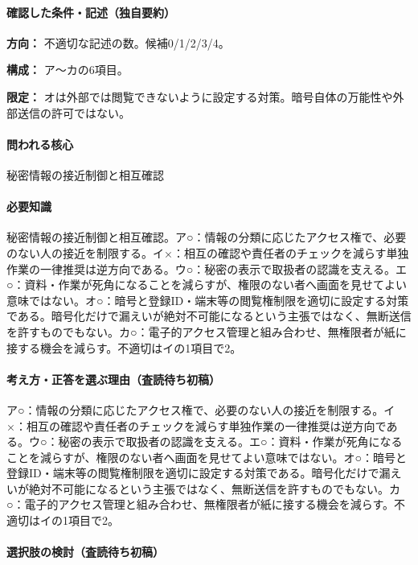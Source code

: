 \paragraph{確認した条件・記述（独自要約）}\mbox{}\par

\noindent\textbf{方向：} 不適切な記述の数。候補0/1/2/3/4。\par

\noindent\textbf{構成：} ア〜カの6項目。\par

\noindent\textbf{限定：} オは外部では閲覧できないように設定する対策。暗号自体の万能性や外部送信の許可ではない。\par

\paragraph{問われる核心} 秘密情報の接近制御と相互確認

\paragraph{必要知識} 秘密情報の接近制御と相互確認。ア○：情報の分類に応じたアクセス権で、必要のない人の接近を制限する。イ×：相互の確認や責任者のチェックを減らす単独作業の一律推奨は逆方向である。ウ○：秘密の表示で取扱者の認識を支える。エ○：資料・作業が死角になることを減らすが、権限のない者へ画面を見せてよい意味ではない。オ○：暗号と登録ID・端末等の閲覧権制限を適切に設定する対策である。暗号化だけで漏えいが絶対不可能になるという主張ではなく、無断送信を許すものでもない。カ○：電子的アクセス管理と組み合わせ、無権限者が紙に接する機会を減らす。不適切はイの1項目で2。

\paragraph{考え方・正答を選ぶ理由（査読待ち初稿）} ア○：情報の分類に応じたアクセス権で、必要のない人の接近を制限する。イ×：相互の確認や責任者のチェックを減らす単独作業の一律推奨は逆方向である。ウ○：秘密の表示で取扱者の認識を支える。エ○：資料・作業が死角になることを減らすが、権限のない者へ画面を見せてよい意味ではない。オ○：暗号と登録ID・端末等の閲覧権制限を適切に設定する対策である。暗号化だけで漏えいが絶対不可能になるという主張ではなく、無断送信を許すものでもない。カ○：電子的アクセス管理と組み合わせ、無権限者が紙に接する機会を減らす。不適切はイの1項目で2。

\paragraph{選択肢の検討（査読待ち初稿）}\mbox{}\par

